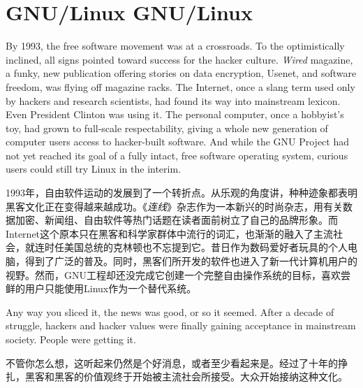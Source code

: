 

\chapter{\ifdefined\eng
GNU/Linux
\fi
\ifdefined\chs
GNU/Linux
\fi}
\thispagestyle{empty}
\ifdefined\eng
By 1993, the free software movement was at a crossroads. To the optimistically inclined, all signs pointed toward success for the hacker culture. \textit{Wired} magazine, a funky, new publication offering stories on data encryption, Usenet, and software freedom, was flying off magazine racks. The Internet, once a slang term used only by hackers and research scientists, had found its way into mainstream lexicon. Even President Clinton was using it. The personal computer, once a hobbyist's toy, had grown to full-scale respectability, giving a whole new generation of computer users access to hacker-built software. And while the GNU Project had not yet reached its goal of a fully intact, free software operating system, curious users could still try Linux in the interim.
\fi

\ifdefined\chs
1993年，自由软件运动的发展到了一个转折点。从乐观的角度讲，种种迹象都表明黑客文化正在变得越来越成功。《\textit{连线}》杂志作为一本新兴的时尚杂志，用有关数据加密、新闻组、自由软件等热门话题在读者面前树立了自己的品牌形象。而Internet这个原本只在黑客和科学家群体中流行的词汇，也渐渐的融入了主流社会，就连时任美国总统的克林顿也不忘提到它。昔日作为数码爱好者玩具的个人电脑，得到了广泛的普及。同时，黑客们所开发的软件也进入了新一代计算机用户的视野。然而，GNU工程却还没完成它创建一个完整自由操作系统的目标，喜欢尝鲜的用户只能使用Linux作为一个替代系统。
\fi

\ifdefined\eng
Any way you sliced it, the news was good, or so it seemed. After a decade of struggle, hackers and hacker values were finally gaining acceptance in mainstream society. People were getting it.
\fi

\ifdefined\chs
不管你怎么想，这听起来仍然是个好消息，或者至少看起来是。经过了十年的挣扎，黑客和黑客的价值观终于开始被主流社会所接受。大众开始接纳这种文化。
\fi

